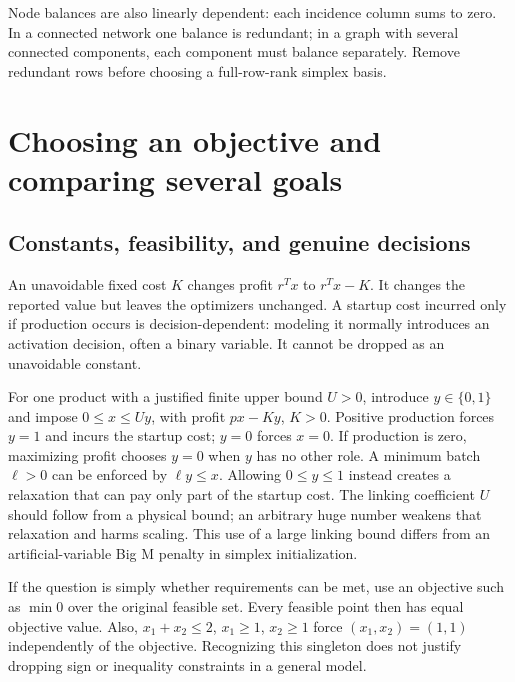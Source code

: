 \documentclass[11pt,a4paper]{article}
\begin{document}
Node balances are also linearly dependent: each incidence column sums to zero.
In a connected network one balance is redundant; in a graph with several
connected components, each component must balance separately. Remove redundant
rows before choosing a full-row-rank simplex basis.

\section{Choosing an objective and comparing several goals}\label{sec:objectives}
\subsection{Constants, feasibility, and genuine decisions}
An unavoidable fixed cost $K$ changes profit $r^Tx$ to $r^Tx-K$. It changes
the reported value but leaves the optimizers unchanged. A startup cost incurred
only if production occurs is decision-dependent: modeling it normally introduces
an activation decision, often a binary variable. It cannot be dropped as an
unavoidable constant.

For one product with a justified finite upper bound $U>0$, introduce
$y\in\{0,1\}$ and impose $0\leq x\leq Uy$, with profit $px-Ky$, $K>0$.
Positive production forces $y=1$ and incurs the startup cost; $y=0$ forces
$x=0$. If production is zero, maximizing profit chooses $y=0$ when $y$ has
no other role. A minimum batch $\ell>0$ can be enforced by $\ell y\leq x$.
Allowing $0\leq y\leq1$ instead creates a relaxation that can pay only part
of the startup cost. The linking coefficient $U$ should follow from a physical
bound; an arbitrary huge number weakens that relaxation and harms scaling.
This use of a large linking bound differs from an artificial-variable Big M
penalty in simplex initialization.

If the question is simply whether requirements can be met, use an objective
such as $\min0$ over the original feasible set. Every feasible point then has
equal objective value. Also, $x_1+x_2\leq2$, $x_1\geq1$, $x_2\geq1$ force
$(x_1,x_2)=(1,1)$ independently of the objective. Recognizing this singleton
does not justify dropping sign or inequality constraints in a general model.
\end{document}
